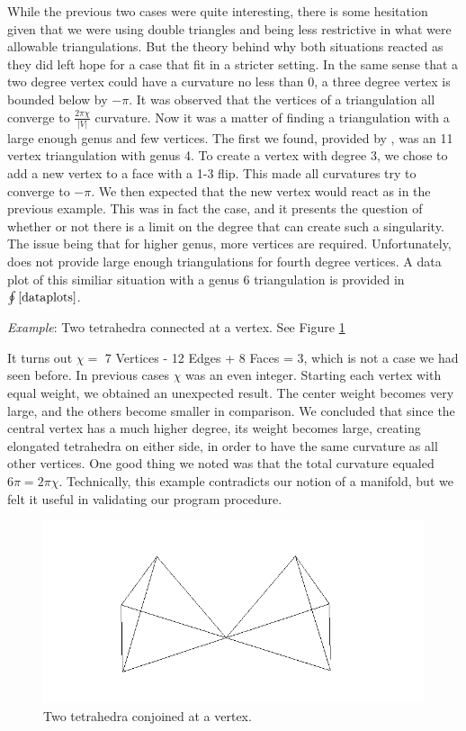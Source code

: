 \documentclass[12pt]{article}
\begin{document}
\noindent While the previous two cases were quite interesting, there is some hesitation given that we were using double triangles and being less restrictive in what were allowable triangulations. But the theory behind why both situations reacted as they did left hope for a case that fit in a stricter setting. In the same sense that a two degree vertex could have a curvature no less than 0, a three degree vertex is bounded below by $-\pi$. It was observed that the vertices of a triangulation all converge to $\displaystyle\frac{2\pi\chi}{|V|}$ curvature. Now it was a matter of finding a triangulation with a large enough genus and few vertices. The first we found, provided by \cite{lutzmanifold}, was an 11 vertex triangulation with genus 4. To create a vertex with degree 3, we chose to add a new vertex to a face with a 1-3 flip. This made all curvatures try to converge to $-\pi$. We then expected that the new vertex would react as in the previous example. This was in fact the case, and it presents the question of whether or not there is a limit on the degree that can create such a singularity. The issue being that for higher genus, more vertices are required. Unfortunately, \cite{lutzmanifold} does not provide large enough triangulations for fourth degree vertices. A data plot of this similiar situation with a genus 6 triangulation is provided in $\oint\ref{dataplots}$. \newline

\noindent \textit{Example}: Two tetrahedra connected at a vertex. See Figure \ref{fig:tt}\newline

\noindent It turns out $\chi = $ 7 Vertices - 12 Edges + 8 Faces = 3, which is not a case we had seen before. In previous cases $\chi$ was an even integer. Starting each vertex with equal weight, we obtained an unexpected result. The center weight becomes very large, and the others become smaller in comparison. We concluded that since the central vertex has a much higher degree, its weight becomes large, creating elongated tetrahedra on either side, in order to have the same curvature as all other vertices. One good thing we noted was that the total curvature equaled $6\pi = 2\pi\chi$. Technically, this example contradicts our notion of a manifold, but we felt it useful in validating our program procedure.  

\begin{figure}
\includegraphics{Pictures/tetratouch.png}
\caption{Two tetrahedra conjoined at a vertex.}
\label{fig:tt}
\end{figure}
\end{document}
